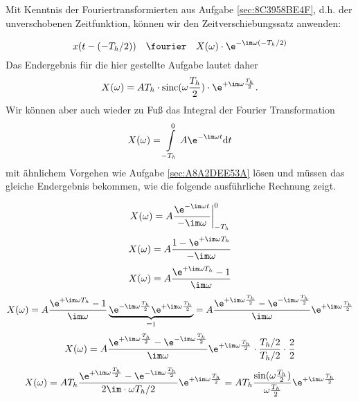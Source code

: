 \begin{Ansatz}
Mit Kenntnis der Fouriertransformierten aus Aufgabe \ref{sec:8C3958BE4F}, d.h. der
unverschobenen Zeitfunktion, können wir den Zeitverschiebungssatz anwenden:

\begin{equation}
x(t - (-T_h/2)) \quad \fourier \quad X(\omega) \cdot \e^{-\im\omega (-T_h/2)}
\end{equation}
Das Endergebnis für die hier gestellte Aufgabe lautet daher
\begin{equation}
X(\omega) = A T_h \cdot \mathrm{sinc}(\omega\frac{T_h}{2}) \cdot  \e^{+\im\omega\frac{T_h}{2}}.
\end{equation}
Wir können aber auch wieder zu Fuß das Integral der Fourier Transformation
\begin{equation}
X(\omega) = \int\limits_{-T_h}^{0} A \e^{-\im \omega t} \mathrm{d}t
\end{equation}
mit ähnlichem Vorgehen wie Aufgabe \ref{sec:A8A2DEE53A} lösen und müssen das
gleiche Endergebnis bekommen, wie die folgende ausführliche Rechnung zeigt.
\end{Ansatz}
\begin{ExCalc}
\begin{equation}
X(\omega) = A \frac{\e^{-\im \omega t}}{-\im \omega} \bigg|_{-T_h}^{0}
\end{equation}
\begin{equation}
X(\omega) = A \frac{1 - \e^{+\im \omega T_h}}{-\im \omega}
\end{equation}
\begin{equation}
X(\omega) = A \frac{\e^{+\im \omega T_h}-1}{\im \omega}
\end{equation}
\begin{equation}
X(\omega) = A \frac{\e^{+\im \omega T_h}-1}{\im \omega} \underbrace{\e^{-\im\omega\frac{T_h}{2}} \e^{+\im\omega\frac{T_h}{2}}}_{=1}=
A \frac{\e^{+\im\omega\frac{T_h}{2}} - \e^{-\im\omega\frac{T_h}{2}}}{\im\omega} \e^{+\im\omega\frac{T_h}{2}}
\end{equation}
\begin{equation}
X(\omega) = A \frac{\e^{+\im\omega\frac{T_h}{2}} - \e^{-\im\omega\frac{T_h}{2}}}{\im\omega} \e^{+\im\omega\frac{T_h}{2}}
\cdot \frac{T_h/2}{T_h/2} \cdot \frac{2}{2}
\end{equation}
\begin{equation}
X(\omega) = A T_h \frac{\e^{+\im\omega\frac{T_h}{2}} - \e^{-\im\omega\frac{T_h}{2}}}{2 \im \cdot \omega T_h/2} \e^{+\im\omega\frac{T_h}{2}} =
A T_h \frac{\sin(\omega\frac{T_h}{2})}{\omega\frac{T_h}{2}} \e^{+\im\omega\frac{T_h}{2}}
\end{equation}
\end{ExCalc}
